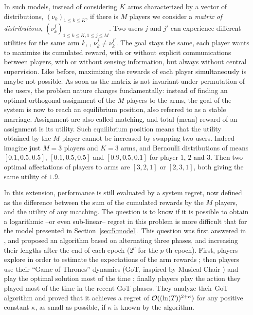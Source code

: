 In such models, instead of considering $K$ arms characterized by a vector of distributions, $(\nu_k)_{1\leq k \leq K}$, if there is $M$ players we consider a \emph{matrix of distributions}, $(\nu_k^j)_{1 \leq k \leq K, 1 \leq j \leq M}$. Two users $j$ and $j'$ can experience different utilities for the same arm $k$, \ie, $\nu_k^{j} \neq \nu_k^{j'}$.
The goal stays the same, each player wants to maximize its cumulated reward, with or without explicit communications between players, with or without sensing information, but always without central supervision.
%
Like before, maximizing the rewards of each player simultaneously is maybe not possible.
As soon as the matrix is not invariant under permutation of the users, the problem nature changes fundamentally:
instead of finding an optimal orthogonal assignment of the $M$ players to the \Mbest{} arms,
the goal of the system is now to reach an equilibrium position, also referred to as a stable marriage.
Assignment are also called matching, and total (mean) reward of an assignment is its utility.
Such equilibrium position means that the utility obtained by the $M$ player cannot be increased by swapping two users.
Indeed imagine just $M=3$ players and $K=3$ arms, and Bernoulli distributions of means $[0.1, 0.5, 0.5]$, $[0.1, 0.5, 0.5]$ and $[0.9, 0.5, 0.1]$ for player $1$, $2$ and $3$. Then two optimal affectations of players to arms are $[3,2,1]$ or $[2,3,1]$, both giving the same utility of $1.9$.

In this extension, performance is still evaluated by a system regret, now defined as the difference between the sum of the cumulated rewards by the $M$ players, and the utility of any matching.
The question is to know if it is possible to obtain a logarithmic --or even sub-linear-- regret in this problem is more difficult that for the model presented in Section~\ref{sec:5:model}.
This question was first answered in \cite{Bistritz18}, and proposed an algorithm based on alternating three phases, and increasing their lengths after the end of each epoch ($2^p$ for the $p$-th epoch).
First, players explore in order to estimate the expectations of the arm rewards ; then players use their ``Game of Thrones'' dynamics (GoT, inspired by Musical Chair \cite{Rosenski16}) and play the optimal solution most of the time ; finally players play the action they played most of the time in the recent GoT phases.
They analyze their GoT algorithm and proved that it achieves a regret of $\mathcal{O}((\ln(T))^{2+\kappa})$ for any positive constant $\kappa$, as small as possible, if $\kappa$ is known by the algorithm.

